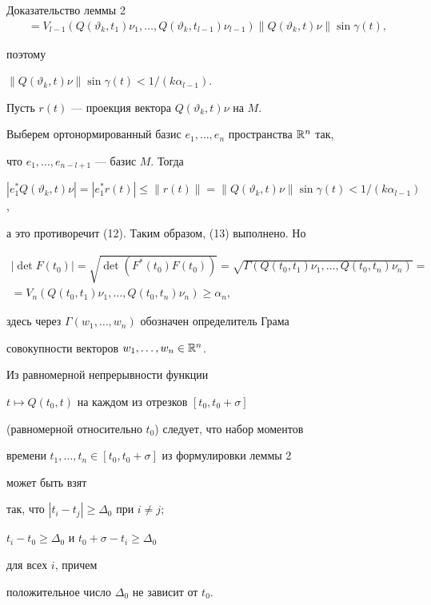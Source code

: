 \begin{pf*}{Доказательство леммы 2}
\begin{multline*}
=V_{l-1}(Q(\vartheta_{k},t_{1})\nu_{1},\dotsc,


Q(\vartheta_{k},t_{l-1})\nu_{l-1})\|Q(\vartheta_{k},t)\nu\|\sin\gamma(t),


\end{multline*}


поэтому


$\|Q(\vartheta_{k},t)\nu\|\sin\gamma(t)<1/(k\alpha_{l-1})$.


Пусть $r(t)$ --- проекция вектора $Q(\vartheta_{k},t)\nu$ на $M$.


Выберем ортонормированный базис $e_1,\dotsc,e_n$ пространства $\Bbb R^n$ так,


что $e_1,\dotsc,e_{n-l+1}$ --- базис $M$. Тогда


$|e_1^{*}Q(\vartheta_{k},t)\nu|=|e_1^*r(t)|\le\|r(t)\|=


\|Q(\vartheta_{k},t)\nu\|\sin\gamma(t)<1/(k\alpha_{l-1})$,


а это противоречит (12). Таким образом, (13) выполнено. Но


\begin{multline*}


|\det F(t_{0})|=\sqrt{\det(F^{*}(t_{0})F(t_{0}))}=


\sqrt{\Gamma (Q(t_{0},t_{1})\nu_{1},\dotsc,Q(t_{0},t_{n})\nu_{n})}=\\


=V_{n}(Q(t_{0},t_{1})\nu_{1},\dotsc,Q(t_{0},t_{n})\nu_{n})\ge\alpha_{n},


\end{multline*}


здесь через $\Gamma(w_{1},\dotsc,w_{n})$ обозначен определитель Грама


совокупности векторов $w_{1},\dotsc,w_{n}\in\Bbb R^n$.


\end{pf*}





\begin{note} Из равномерной непрерывности функции


$t\mapsto Q(t_{0},t)$ на каждом из отрезков $[t_{0},t_{0}+\sigma]$


(равномерной относительно $t_{0}$) следует, что набор моментов


времени $t_{1},\dotsc,t_{n}\in[t_{0},t_{0}+\sigma]$ из формулировки леммы 2


может быть взят


так, что $|t_{i}-t_{j}|\ge\varDelta_{0}$ при $i\ne j$;


$t_{i}-t_{0}\ge\varDelta_{0}$ и $t_{0}+\sigma-t_{i}\ge \varDelta_{0}$


для всех $i$, причем


положительное число $\varDelta_{0}$ не зависит от $t_{0}$.


\end{note}





